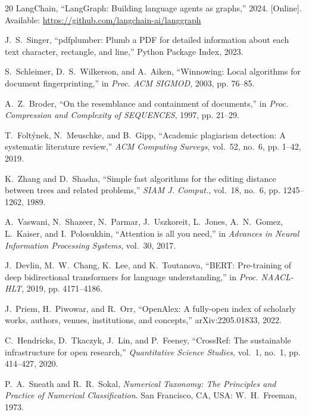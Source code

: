 \documentclass[conference]{IEEEtran}
\begin{document}
\begin{thebibliography}{20}
LangChain, ``LangGraph: Building language agents as graphs,'' 2024. [Online]. Available: \url{https://github.com/langchain-ai/langgraph}

J.~S.~Singer, ``pdfplumber: Plumb a PDF for detailed information about each text character, rectangle, and line,'' Python Package Index, 2023.

S.~Schleimer, D.~S.~Wilkerson, and A.~Aiken, ``Winnowing: Local algorithms for document fingerprinting,'' in \textit{Proc. ACM SIGMOD}, 2003, pp. 76--85.

A.~Z.~Broder, ``On the resemblance and containment of documents,'' in \textit{Proc. Compression and Complexity of SEQUENCES}, 1997, pp. 21--29.

T.~Folt\'ynek, N.~Meuschke, and B.~Gipp, ``Academic plagiarism detection: A systematic literature review,'' \textit{ACM Computing Surveys}, vol.~52, no.~6, pp. 1--42, 2019.

K.~Zhang and D.~Shasha, ``Simple fast algorithms for the editing distance between trees and related problems,'' \textit{SIAM J. Comput.}, vol.~18, no.~6, pp. 1245--1262, 1989.

A.~Vaswani, N.~Shazeer, N.~Parmar, J.~Uszkoreit, L.~Jones, A.~N.~Gomez, L.~Kaiser, and I.~Polosukhin, ``Attention is all you need,'' in \textit{Advances in Neural Information Processing Systems}, vol.~30, 2017.

J.~Devlin, M.~W.~Chang, K.~Lee, and K.~Toutanova, ``BERT: Pre-training of deep bidirectional transformers for language understanding,'' in \textit{Proc. NAACL-HLT}, 2019, pp. 4171--4186.

J.~Priem, H.~Piwowar, and R.~Orr, ``OpenAlex: A fully-open index of scholarly works, authors, venues, institutions, and concepts,'' arXiv:2205.01833, 2022.

C.~Hendricks, D.~Tkaczyk, J.~Lin, and P.~Feeney, ``CrossRef: The sustainable infrastructure for open research,'' \textit{Quantitative Science Studies}, vol.~1, no.~1, pp. 414--427, 2020.

P.~A.~Sneath and R.~R.~Sokal, \textit{Numerical Taxonomy: The Principles and Practice of Numerical Classification}. San Francisco, CA, USA: W.~H.~Freeman, 1973.
\end{thebibliography}
\end{document}
